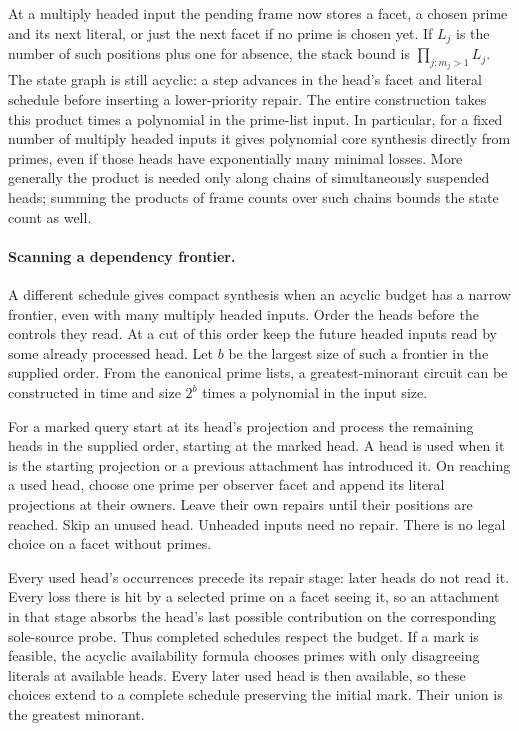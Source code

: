 At a multiply headed input the pending frame now
stores a facet, a chosen prime and its next literal,
or just the next facet if no prime is chosen yet.
If $L_j$ is the number of such positions plus one
for absence, the stack bound is $\prod_{j:m_j>1}L_j$.
The state graph is still acyclic: a step advances
in the head's facet and literal schedule before
inserting a lower-priority repair. The entire
construction takes this product times a polynomial
in the prime-list input. In particular, for a fixed
number of multiply headed inputs it gives polynomial
core synthesis directly from primes, even if those
heads have exponentially many minimal losses.
More generally the product is needed only along
chains of simultaneously suspended heads; summing
the products of frame counts over such chains
bounds the state count as well.

\paragraph{Scanning a dependency frontier.}
A different schedule gives compact synthesis when an
acyclic budget has a narrow frontier, even with many
multiply headed inputs. Order the heads before the
controls they read. At a cut of this order keep the
future headed inputs read by some already processed
head. Let $b$ be the largest size of such a frontier
in the supplied order. From the canonical prime lists,
a greatest-minorant circuit can be constructed in time
and size $2^b$ times a polynomial in the input size.

For a marked query start at its head's projection and
process the remaining heads in the supplied order,
starting at the marked head. A head is used when it
is the starting projection or a previous attachment
has introduced it. On reaching a used head, choose
one prime per observer facet and append its literal
projections at their owners. Leave their own repairs
until their positions are reached. Skip an unused
head. Unheaded inputs need no repair. There is no
legal choice on a facet without primes.

Every used head's occurrences precede its repair
stage: later heads do not read it. Every loss there
is hit by a selected prime on a facet seeing it,
so an attachment in that stage absorbs the head's
last possible contribution on the corresponding
sole-source probe. Thus completed schedules respect
the budget. If a mark is feasible, the acyclic
availability formula chooses primes with only
disagreeing literals at available heads. Every later
used head is then available, so these choices extend
to a complete schedule preserving the initial mark.
Their union is the greatest minorant.

